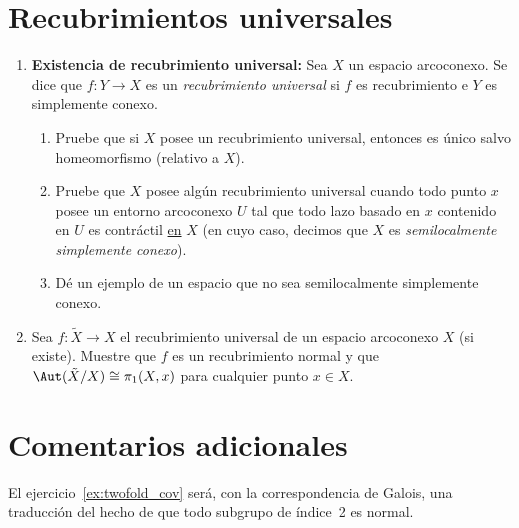 \documentclass[11pt, reqno]{amsart}
\begin{document}
\section{Recubrimientos universales}
\begin{enumerate}[resume]
	\item \textbf{Existencia de recubrimiento universal:}
		Sea $X$ un espacio arcoconexo.
		Se dice que $f\colon Y \to X$ es un \emph{recubrimiento universal} si $f$ es recubrimiento e $Y$ es simplemente conexo.
		\begin{enumerate}
			\item Pruebe que si $X$ posee un recubrimiento universal, entonces es único salvo homeomorfismo (relativo a $X$).
			\item\lookst
				Pruebe que $X$ posee algún recubrimiento universal cuando todo punto $x$ posee un entorno arcoconexo $U$ tal
				que todo lazo basado en $x$ contenido en $U$ es contráctil \underline{en} $X$ (en cuyo caso, decimos que $X$
				es \emph{semilocalmente simplemente conexo}).
			\item\lookup
				Dé un ejemplo de un espacio que no sea semilocalmente simplemente conexo.
		\end{enumerate}

	\item Sea $f \colon \tilde X \to X$ el recubrimiento universal de un espacio arcoconexo $X$ (si existe).
		Muestre que $f$ es un recubrimiento normal y que $\Aut(\tilde X/X) \cong \pi_1(X, x)$ para cualquier punto $x \in X$.
\end{enumerate}

\section*{Comentarios adicionales}
El ejercicio~\ref{ex:twofold_cov} será, con la correspondencia de Galois, una traducción del hecho de que todo subgrupo de índice~2 es normal.

\printbibliography
\end{document}
